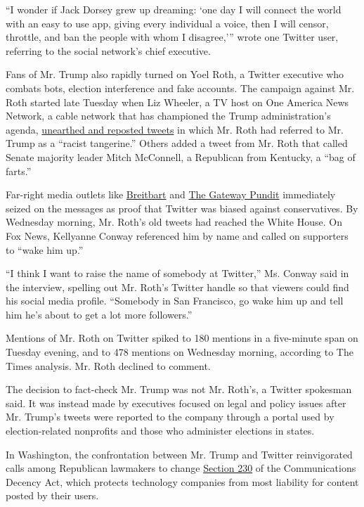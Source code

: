 ``I wonder if Jack Dorsey grew up dreaming: `one day I will connect the
world with an easy to use app, giving every individual a voice, then I
will censor, throttle, and ban the people with whom I disagree,''' wrote
one Twitter user, referring to the social network's chief executive.

Fans of Mr. Trump also rapidly turned on Yoel Roth, a Twitter executive
who combats bots, election interference and fake accounts. The campaign
against Mr. Roth started late Tuesday when Liz Wheeler, a TV host on One
America News Network, a cable network that has championed the Trump
administration's agenda,
\href{https://twitter.com/Liz_Wheeler/status/1265463081997484032}{unearthed
and reposted tweets} in which Mr. Roth had referred to Mr. Trump as a
``racist tangerine.'' Others added a tweet from Mr. Roth that called
Senate majority leader Mitch McConnell, a Republican from Kentucky, a
``bag of farts.''

Far-right media outlets like
\href{https://www.breitbart.com/tech/2020/05/26/twitter-fact-checker-claimed-trump-actual-nazis-mocked-flyover-states/}{Breitbart}
and
\href{https://www.thegatewaypundit.com/2020/05/report-twitters-head-site-integrity-responsible-election-security-misinformation-says-nazis-white-house/}{The
Gateway Pundit} immediately seized on the messages as proof that Twitter
was biased against conservatives. By Wednesday morning, Mr. Roth's old
tweets had reached the White House. On Fox News, Kellyanne Conway
referenced him by name and called on supporters to ``wake him up.''

``I think I want to raise the name of somebody at Twitter,'' Ms. Conway
said in the interview, spelling out Mr. Roth's Twitter handle so that
viewers could find his social media profile. ``Somebody in San
Francisco, go wake him up and tell him he's about to get a lot more
followers.''

Mentions of Mr. Roth on Twitter spiked to 180 mentions in a five-minute
span on Tuesday evening, and to 478 mentions on Wednesday morning,
according to The Times analysis. Mr. Roth declined to comment.

The decision to fact-check Mr. Trump was not Mr. Roth's, a Twitter
spokesman said. It was instead made by executives focused on legal and
policy issues after Mr. Trump's tweets were reported to the company
through a portal used by election-related nonprofits and those who
administer elections in states.

In Washington, the confrontation between Mr. Trump and Twitter
reinvigorated calls among Republican lawmakers to change
\href{https://www.nytimes.com/2020/02/04/technology/section-230-lobby.html}{Section
230} of the Communications Decency Act, which protects technology
companies from most liability for content posted by their users.

